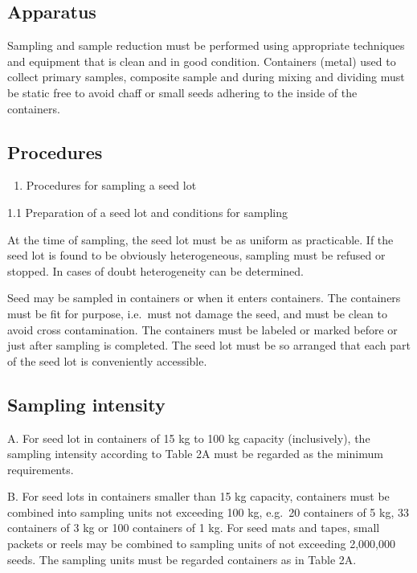 \documentclass[]{book}
\providecommand{\tightlist}{%
  \setlength{\itemsep}{0pt}\setlength{\parskip}{0pt}}
\begin{document}
\subsection{Apparatus}\label{apparatus}

Sampling and sample reduction must be performed using appropriate
techniques and equipment that is clean and in good condition. Containers
(metal) used to collect primary samples, composite sample and during
mixing and dividing must be static free to avoid chaff or small seeds
adhering to the inside of the containers.

\subsection{Procedures}\label{procedures}

\begin{enumerate}
\def\labelenumi{\arabic{enumi}.}
\tightlist
\item
  Procedures for sampling a seed lot
\end{enumerate}

1.1 Preparation of a seed lot and conditions for sampling

At the time of sampling, the seed lot must be as uniform as practicable.
If the seed lot is found to be obviously heterogeneous, sampling must be
refused or stopped. In cases of doubt heterogeneity can be determined.

Seed may be sampled in containers or when it enters containers. The
containers must be fit for purpose, i.e.~must not damage the seed, and
must be clean to avoid cross contamination. The containers must be
labeled or marked before or just after sampling is completed. The seed
lot must be so arranged that each part of the seed lot is conveniently
accessible.

\subsection{Sampling intensity}\label{sampling-intensity-1}

A. For seed lot in containers of 15 kg to 100 kg capacity (inclusively),
the sampling intensity according to Table 2A must be regarded as the
minimum requirements.

B. For seed lots in containers smaller than 15 kg capacity, containers
must be combined into sampling units not exceeding 100 kg, e.g.~20
containers of 5 kg, 33 containers of 3 kg or 100 containers of 1 kg. For
seed mats and tapes, small packets or reels may be combined to sampling
units of not exceeding 2,000,000 seeds. The sampling units must be
regarded containers as in Table 2A.
\end{document}
